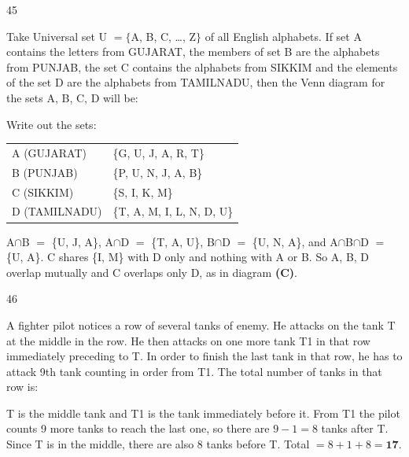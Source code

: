 \begin{question}{45}
{Take Universal set U $=\{$A, B, C, \ldots, Z$\}$ of all English alphabets. If set A contains the letters from GUJARAT, the members of set B are the alphabets from PUNJAB, the set C contains the alphabets from SIKKIM and the elements of the set D are the alphabets from TAMILNADU, then the Venn diagram for the sets A, B, C, D will be:\par}
\begin{explain}
Write out the sets:
\begin{center}\small
\begin{tabular}{ll}
A (GUJARAT) & \{G, U, J, A, R, T\}\\ B (PUNJAB) & \{P, U, N, J, A, B\}\\ C (SIKKIM) & \{S, I, K, M\}\\ D (TAMILNADU) & \{T, A, M, I, L, N, D, U\}\\
\end{tabular}
\end{center}
A$\cap$B $=$ \{U, J, A\}, A$\cap$D $=$ \{T, A, U\}, B$\cap$D $=$ \{U, N, A\}, and A$\cap$B$\cap$D $=$ \{U, A\}. C shares \{I, M\} with D only and nothing with A or B.
So A, B, D overlap mutually and C overlaps only D, as in diagram \textbf{(C)}.
\end{explain}
\end{question}

\begin{question}{46}
{A fighter pilot notices a row of several tanks of enemy. He attacks on the tank T at the middle in the row. He then attacks on one more tank T1 in that row immediately preceding to T. In order to finish the last tank in that row, he has to attack 9th tank counting in order from T1. The total number of tanks in that row is:\par}
\begin{explain}
T is the middle tank and T1 is the tank immediately before it. From T1 the pilot counts 9 more tanks to reach the last one, so there are $9-1=8$ tanks after T. Since T is in the middle, there are also 8 tanks before T.
Total $=8+1+8=\mathbf{17}$.
\end{explain}
\end{question}

